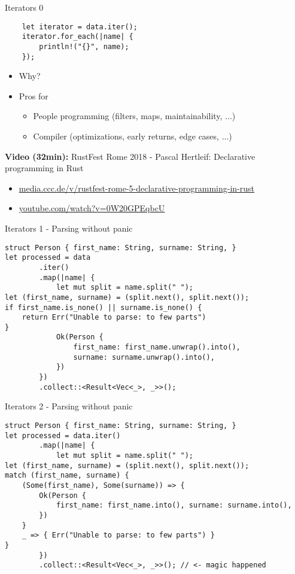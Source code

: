 \documentclass[aspectratio=1610,t]{beamer}
\begin{document}
\begin{frame}[fragile]{Iterators 0}
\begin{verbatim}
    let iterator = data.iter();
    iterator.for_each(|name| {
        println!("{}", name);
    });
\end{verbatim}

\begin{itemize}
 \item Why?
 \item Pros for
    \begin{itemize}
     \item People programming (filters, maps, maintainability, ...)
     \item Compiler (optimizations, early returns, edge cases, ...)
    \end{itemize}
\end{itemize}

\textbf{Video (32min):} RustFest Rome 2018 - Pascal Hertleif: Declarative programming in Rust
\begin{itemize}
  \item \href{https://media.ccc.de/v/rustfest-rome-5-declarative-programming-in-rust}{media.ccc.de/v/rustfest-rome-5-declarative-programming-in-rust}
  \item \href{https://www.youtube.com/watch?v=0W20GPEqbcU}{youtube.com/watch?v=0W20GPEqbcU}
\end{itemize}

\end{frame}



\begin{frame}[fragile]{Iterators 1 - Parsing without panic}
\begin{verbatim}
struct Person { first_name: String, surname: String, }
let processed = data
        .iter()
        .map(|name| {
            let mut split = name.split(" ");
let (first_name, surname) = (split.next(), split.next());
if first_name.is_none() || surname.is_none() {
    return Err("Unable to parse: to few parts")
}
            Ok(Person {
                first_name: first_name.unwrap().into(),
                surname: surname.unwrap().into(),
            })
        })
        .collect::<Result<Vec<_>, _>>();
\end{verbatim}
\end{frame}


\begin{frame}[fragile]{Iterators 2 - Parsing without panic}
\begin{verbatim}
struct Person { first_name: String, surname: String, }
let processed = data.iter()
        .map(|name| {
            let mut split = name.split(" ");
let (first_name, surname) = (split.next(), split.next());
match (first_name, surname) {
    (Some(first_name), Some(surname)) => {
        Ok(Person {
            first_name: first_name.into(), surname: surname.into(),
        })
    }
    _ => { Err("Unable to parse: to few parts") }
}
        })
        .collect::<Result<Vec<_>, _>>(); // <- magic happened
\end{verbatim}
\end{frame}
\end{document}
